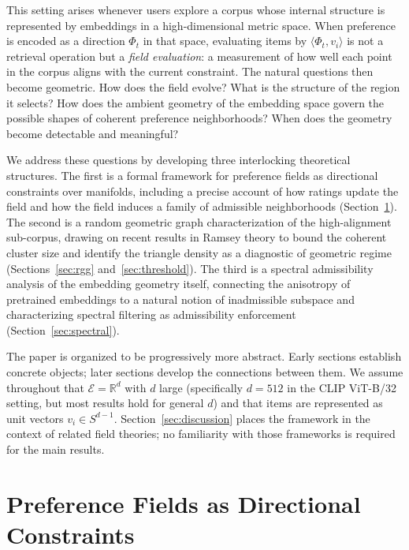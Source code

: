 \documentclass[12pt, a4paper]{article}
\theoremstyle{plain}
\theoremstyle{definition}
\begin{document}
This setting arises whenever users explore a corpus whose internal structure
is represented by embeddings in a high-dimensional metric space. When
preference is encoded as a direction $\Phi_t$ in that space, evaluating
items by $\langle \Phi_t, v_i \rangle$ is not a retrieval operation but a
\textit{field evaluation}: a measurement of how well each point in the corpus
aligns with the current constraint. The natural questions then become
geometric. How does the field evolve? What is the structure of the region it
selects? How does the ambient geometry of the embedding space govern the
possible shapes of coherent preference neighborhoods? When does the geometry
become detectable and meaningful?

We address these questions by developing three interlocking theoretical
structures. The first is a formal framework for preference fields as
directional constraints over manifolds, including a precise account of how
ratings update the field and how the field induces a family of admissible
neighborhoods (Section~\ref{sec:fields}). The second is a random geometric
graph characterization of the high-alignment sub-corpus, drawing on recent
results in Ramsey theory to bound the coherent cluster size and identify the
triangle density as a diagnostic of geometric regime (Sections~\ref{sec:rgg}
and~\ref{sec:threshold}). The third is a spectral admissibility analysis of
the embedding geometry itself, connecting the anisotropy of pretrained
embeddings to a natural notion of inadmissible subspace and characterizing
spectral filtering as admissibility enforcement (Section~\ref{sec:spectral}).

The paper is organized to be progressively more abstract. Early sections
establish concrete objects; later sections develop the connections between
them. We assume throughout that $\mathcal{E} = \mathbb{R}^d$ with $d$ large
(specifically $d = 512$ in the CLIP ViT-B/32 setting, but most results hold
for general $d$) and that items are represented as unit vectors $v_i \in
S^{d-1}$. Section~\ref{sec:discussion} places the framework in the context of
related field theories; no familiarity with those frameworks is required for
the main results.

\section{Preference Fields as Directional Constraints}
\label{sec:fields}
\end{document}
